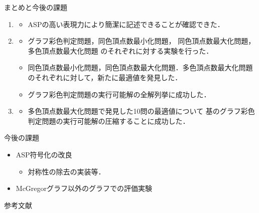 \documentclass[dvipdfmx,11pt]{beamer}
\begin{document}
\begin{frame}{まとめと今後の課題}

 \begin{enumerate}
  \item {}
        \begin{itemize}
         \item ASPの高い表現力により簡潔に記述できることが確認できた．
        \end{itemize}
  \item {}
        \begin{itemize}
         \item グラフ彩色判定問題，同色頂点数最小化問題，
               同色頂点数最大化問題，多色頂点数最大化問題
               のそれぞれに対する実験を行った．
         \item 同色頂点数最小化問題，同色頂点数最大化問題．多色頂点数最大化問題
               のそれぞれに対して，新たに最適値を発見した．
         \item グラフ彩色判定問題の実行可能解の全解列挙に成功した．%
        \end{itemize}
  \item {}
        \begin{itemize}
         \item 多色頂点数最大化問題で発見した10問の最適値について
               基のグラフ彩色判定問題の実行可能解の圧縮することに成功した．
        \end{itemize}
 \end{enumerate}

 \begin{block}{今後の課題}
  \begin{itemize}
   \item ASP符号化の改良
         \begin{itemize}
          \item 対称性の除去の実装等．
         \end{itemize}
   \item McGregorグラフ以外のグラフでの評価実験
  \end{itemize}
 \end{block}
 
\end{frame}


\begin{frame}[noframenumbering]{参考文献}
\end{frame}
\end{document}
